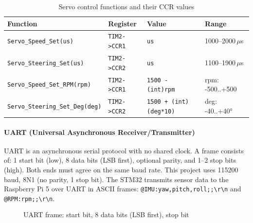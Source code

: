 \documentclass[12pt,a4paper]{article}
\begin{document}
\begin{table}[H]
\centering
\begin{tabular}{llll}
\hline
\textbf{Function} & \textbf{Register} & \textbf{Value} & \textbf{Range} \\
\hline
\texttt{Servo\_Speed\_Set(us)}    & \texttt{TIM2->CCR1} & \texttt{us} & 1000--2000\,\(\mu\)s \\
\texttt{Servo\_Steering\_Set(us)} & \texttt{TIM2->CCR2} & \texttt{us} & 1100--1900\,\(\mu\)s \\
\texttt{Servo\_Speed\_Set\_RPM(rpm)}   & \texttt{TIM2->CCR1} & \texttt{1500 - (int)rpm} & rpm: -500..+500 \\
\texttt{Servo\_Steering\_Set\_Deg(deg)} & \texttt{TIM2->CCR2} & \texttt{1500 + (int)(deg*10)} & deg: -40..+40° \\
\hline
\end{tabular}
\caption{Servo control functions and their CCR values}
\end{table}

\paragraph{UART (Universal Asynchronous Receiver/Transmitter)}

UART is an asynchronous serial protocol with no shared clock.
A frame consists of: 1 start bit (low), 8 data bits (LSB first), optional parity, and 1--2 stop bits (high).
Both ends must agree on the same baud rate. This project uses 115200\,baud, 8N1 (no parity, 1 stop bit).
The STM32 transmits sensor data to the Raspberry Pi 5 over UART in ASCII frames:
\texttt{@IMU:yaw,pitch,roll;;\textbackslash r\textbackslash n} and \texttt{@RPM:rpm;;\textbackslash r\textbackslash n}.

\begin{figure}[h]
\centering
{}
\caption{UART frame: start bit, 8 data bits (LSB first), stop bit}
\end{figure}
\end{document}
